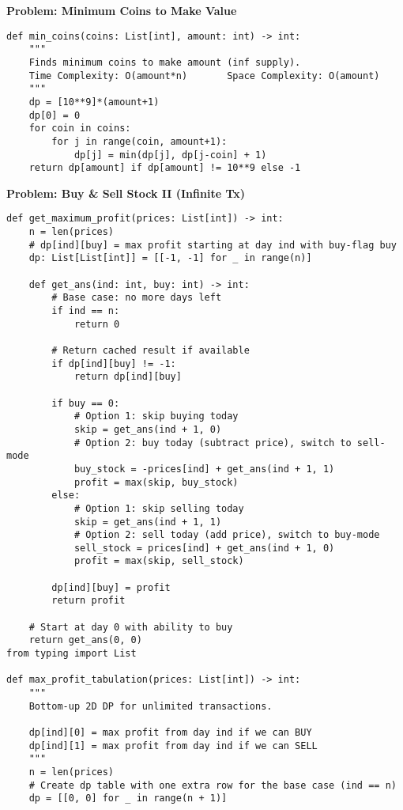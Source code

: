 \noindent\textbf{Problem: Minimum Coins to Make Value}
\begin{verbatim}
def min_coins(coins: List[int], amount: int) -> int:
    """
    Finds minimum coins to make amount (inf supply).
    Time Complexity: O(amount*n)       Space Complexity: O(amount)
    """
    dp = [10**9]*(amount+1)
    dp[0] = 0
    for coin in coins:
        for j in range(coin, amount+1):
            dp[j] = min(dp[j], dp[j-coin] + 1)
    return dp[amount] if dp[amount] != 10**9 else -1
\end{verbatim}

\noindent\textbf{Problem: Buy \& Sell Stock II (Infinite Tx)}
\begin{verbatim}
def get_maximum_profit(prices: List[int]) -> int:
    n = len(prices)
    # dp[ind][buy] = max profit starting at day ind with buy-flag buy
    dp: List[List[int]] = [[-1, -1] for _ in range(n)]
    
    def get_ans(ind: int, buy: int) -> int:
        # Base case: no more days left
        if ind == n:
            return 0
        
        # Return cached result if available
        if dp[ind][buy] != -1:
            return dp[ind][buy]
        
        if buy == 0:
            # Option 1: skip buying today
            skip = get_ans(ind + 1, 0)
            # Option 2: buy today (subtract price), switch to sell-mode
            buy_stock = -prices[ind] + get_ans(ind + 1, 1)
            profit = max(skip, buy_stock)
        else:
            # Option 1: skip selling today
            skip = get_ans(ind + 1, 1)
            # Option 2: sell today (add price), switch to buy-mode
            sell_stock = prices[ind] + get_ans(ind + 1, 0)
            profit = max(skip, sell_stock)
        
        dp[ind][buy] = profit
        return profit
    
    # Start at day 0 with ability to buy
    return get_ans(0, 0)
from typing import List

def max_profit_tabulation(prices: List[int]) -> int:
    """
    Bottom-up 2D DP for unlimited transactions.
    
    dp[ind][0] = max profit from day ind if we can BUY
    dp[ind][1] = max profit from day ind if we can SELL
    """
    n = len(prices)
    # Create dp table with one extra row for the base case (ind == n)
    dp = [[0, 0] for _ in range(n + 1)]


\end{verbatim}

